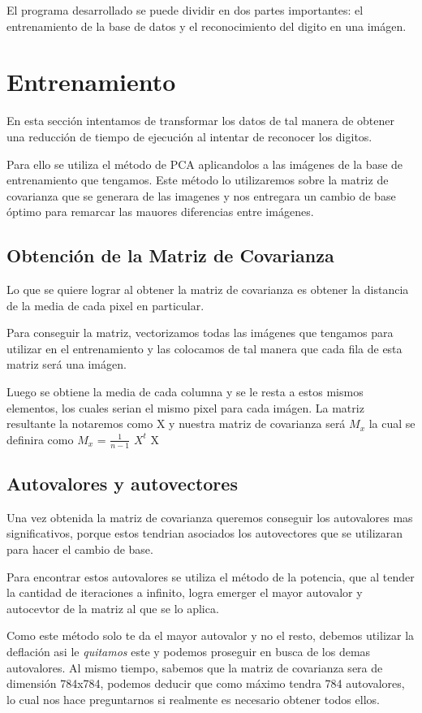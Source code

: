 El programa desarrollado se puede dividir en dos partes importantes: el entrenamiento de la base de datos y el reconocimiento del digito en una imágen.

\section{Entrenamiento}
En esta sección intentamos de transformar los datos de tal manera de obtener una reducción de tiempo de ejecución al intentar de reconocer los digitos. 

Para ello se utiliza el método de PCA aplicandolos a las imágenes de la base de entrenamiento que tengamos. Este método lo utilizaremos sobre la matriz de covarianza que se generara de las imagenes y nos entregara un cambio de base óptimo para remarcar las mauores diferencias entre imágenes.

\subsection{Obtención de la Matriz de Covarianza}

Lo que se quiere lograr al obtener la matriz de covarianza es obtener la distancia de la media de cada pixel en particular.

Para conseguir la matriz, vectorizamos todas las imágenes que tengamos para utilizar en el entrenamiento y las colocamos de tal manera que cada fila de esta matriz será una imágen.

Luego se obtiene la media de cada columna y se le resta a estos mismos elementos, los cuales serian el mismo pixel para cada imágen. La matriz resultante la notaremos como X y nuestra matriz de covarianza será $M_{x}$ la cual se definira como $M_{x}$ = $\frac{1}{n-1}$ $X^{t}$ X

\subsection{Autovalores y autovectores}

Una vez obtenida la matriz de covarianza queremos conseguir los autovalores mas significativos, porque estos tendrian asociados los autovectores que se utilizaran para hacer el cambio de base. 

Para encontrar estos autovalores se utiliza el método de la potencia, que al tender la cantidad de iteraciones a infinito, logra emerger el mayor autovalor y autocevtor de la matriz al que se lo aplica.

Como este método solo te da el mayor autovalor y no el resto, debemos utilizar la deflación asi le \textit{quitamos} este y podemos proseguir en busca de los demas autovalores. Al mismo tiempo, sabemos que la matriz de covarianza sera de dimensión 784x784, podemos deducir que como máximo tendra 784 autovalores, lo cual nos hace preguntarnos si realmente es necesario obtener todos ellos.

